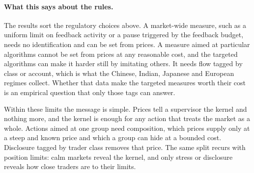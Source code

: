 \paragraph{What this says about the rules.} The results sort the regulatory choices above. A market-wide measure, such as a uniform limit on feedback activity or a pause triggered by the feedback budget, needs no identification and can be set from prices. A measure aimed at particular algorithms cannot be set from prices at any reasonable cost, and the targeted algorithms can make it harder still by imitating others. It needs flow tagged by class or account, which is what the Chinese, Indian, Japanese and European regimes collect. Whether that data make the targeted measures worth their cost is an empirical question that only those tags can answer.

Within these limits the message is simple. Prices tell a supervisor the kernel and nothing more, and the kernel is enough for any action that treats the market as a whole. Actions aimed at one group need composition, which prices supply only at a steep and known price and which a group can hide at a bounded cost. Disclosure tagged by trader class removes that price. The same split recurs with position limits: calm markets reveal the kernel, and only stress or disclosure reveals how close traders are to their limits.
